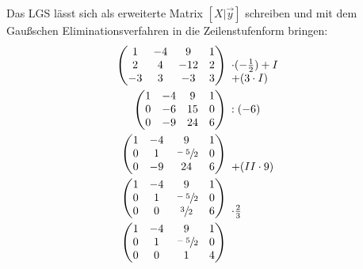 Das LGS lässt sich als erweiterte Matrix $\displaystyle [ X|\vec{y}]$ schreiben und mit dem Gaußschen Eliminationsverfahren in die Zeilenstufenform bringen:
\begin{align*}
  \begin{pmatrix}
    1 & -4 & 9 & 1\\
    2 & 4 & -12 & 2\\
    -3 & 3 & -3 & 3
  \end{pmatrix} & \begin{array}{ l c }
    & \\
    \cdot ( -\frac{1}{2}) +I & \\
    +( 3\cdot I) & 
  \end{array}\\
  \begin{pmatrix}
    1 & -4 & 9 & 1\\
    0 & -6 & 15 & 0\\
    0 & -9 & 24 & 6
  \end{pmatrix} & \begin{array}{ l c }
    & \\
    :( -6) & \\
    & 
  \end{array}\\
  \begin{pmatrix}
    1 & -4 & 9 & 1\\
    0 & 1 & \sfrac{-5}{2} & 0\\
    0 & -9 & 24 & 6
  \end{pmatrix} & \begin{array}{ l c }
    & \\
    & \\
    +( II\cdot 9) & 
  \end{array}\\
  \begin{pmatrix}
    1 & -4 & 9 & 1\\
    0 & 1 & \sfrac{-5}{2} & 0\\
    0 & 0 & \sfrac{3}{2} & 6
  \end{pmatrix} & \begin{array}{ l c }
    & \\
    & \\
    \cdot \frac{2}{3} & 
  \end{array}\\
  \begin{pmatrix}
    1 & -4 & 9 & 1\\
    0 & 1 & \sfrac{-5}{2} & 0\\
    0 & 0 & 1 & 4
  \end{pmatrix} & 
\end{align*}

